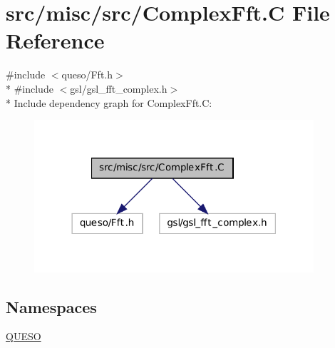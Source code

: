 \hypertarget{_complex_fft_8_c}{\section{src/misc/src/\-Complex\-Fft.C File Reference}
\label{_complex_fft_8_c}
}
{\ttfamily \#include $<$queso/\-Fft.\-h$>$}\\*
{\ttfamily \#include $<$gsl/gsl\-\_\-fft\-\_\-complex.\-h$>$}\\*
Include dependency graph for Complex\-Fft.\-C\-:
\nopagebreak
\begin{figure}[H]
\begin{center}
\leavevmode
\includegraphics[width=294pt]{_complex_fft_8_c__incl}
\end{center}
\end{figure}
\subsection*{Namespaces}
\begin{DoxyCompactItemize}
\item 
\hyperlink{namespace_q_u_e_s_o}{Q\-U\-E\-S\-O}
\end{DoxyCompactItemize}
